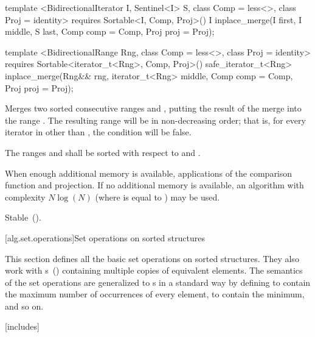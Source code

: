 %
\begin{itemdecl}
template <BidirectionalIterator I, Sentinel<I> S, class Comp = less<>,
    class Proj = identity>
  requires Sortable<I, Comp, Proj>()
  I
    inplace_merge(I first, I middle, S last, Comp comp = Comp{}, Proj proj = Proj{});

template <BidirectionalRange Rng, class Comp = less<>, class Proj = identity>
  requires Sortable<iterator_t<Rng>, Comp, Proj>()
  safe_iterator_t<Rng>
    inplace_merge(Rng&& rng, iterator_t<Rng> middle, Comp comp = Comp{},
                  Proj proj = Proj{});
\end{itemdecl}

\begin{itemdescr}
\pnum
\effects
Merges two sorted consecutive ranges
and
,
putting the result of the merge into the range
.
The resulting range will be in non-decreasing order;
that is, for every iterator
in
other than
,
the condition
will be false.

\pnum
\requires
The ranges  and  shall be
sorted with respect to  and .

\pnum
\returns {}

\pnum
\complexity
When enough additional memory is available,
applications of the comparison function and projection.
If no additional memory is available, an algorithm with complexity
$N \log(N)$
(where
is equal to
)
may be used.

\pnum
\remarks Stable~().
\end{itemdescr}

[alg.set.operations]{Set operations on sorted structures}

\pnum
This section defines all the basic set operations on sorted structures.
They also work with
s~()
containing multiple copies of equivalent elements.
The semantics of the set operations are generalized to
s
in a standard way by defining
to contain the maximum number of occurrences of every element,
to contain the minimum, and so on.

[includes]{}

